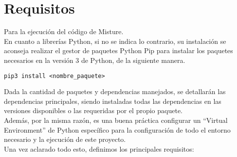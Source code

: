 \cleardoublepage

\chapter{Requisitos}
\label{app:req}

Para la ejecución del código de Misture.\\

En cuanto a librerías Python, si no se indica lo contrario, su instalación se aconseja realizar el gestor de paquetes Python Pip para instalar los paquetes necesarios en la versión 3 de Python, de la siguiente manera.\\


\begin{center}
\begin{verbatim}
pip3 install <nombre_paquete>
\end{verbatim}
\end{center}


Dada la cantidad de paquetes y dependencias manejados, se detallarán las dependencias principales, siendo instaladas todas las dependencias en las versiones disponibles o las requeridas por el propio paquete.\\


Además, por la misma razón, es una buena práctica configurar un ``Virtual Environment'' de Python específico para la configuración de todo el entorno necesario y la ejecución de este proyecto.\\


Una vez aclarado todo esto, definimos los principales requisitos:\\

